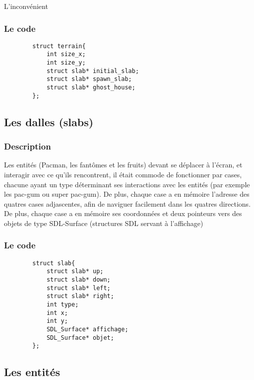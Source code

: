 \documentclass[a4paper,11pt]{article}
\begin{document}
    L'inconvénient

    \subsubsection{Le code}

    \begin{verbatim}
        struct terrain{
            int size_x;
            int size_y;    
            struct slab* initial_slab;
            struct slab* spawn_slab;
            struct slab* ghost_house;
        };
    \end{verbatim}

    \subsection{Les dalles (slabs)}

    \subsubsection{Description}

    Les entités (Pacman, les fantômes et les fruits) devant se déplacer à l'écran, et interagir avec ce qu'ils rencontrent, il était commode de fonctionner par cases, chacune ayant un type déterminant ses interactions avec les entités (par exemple les pac-gum ou super pac-gum). De plus, chaque case a en mémoire l'adresse des quatres cases adjascentes, afin de naviguer facilement dans les quatres directions. De plus, chaque case a en mémoire ses coordonnées et deux pointeurs vers des objets de type SDL-Surface (structures SDL servant à l'affichage)

    \subsubsection{Le code}

    \begin{verbatim}
        struct slab{
            struct slab* up;
            struct slab* down;
            struct slab* left;
            struct slab* right;
            int type;
            int x;
            int y;
            SDL_Surface* affichage;
            SDL_Surface* objet;
        };
    \end{verbatim}

    \subsection{Les entités}
\end{document}
